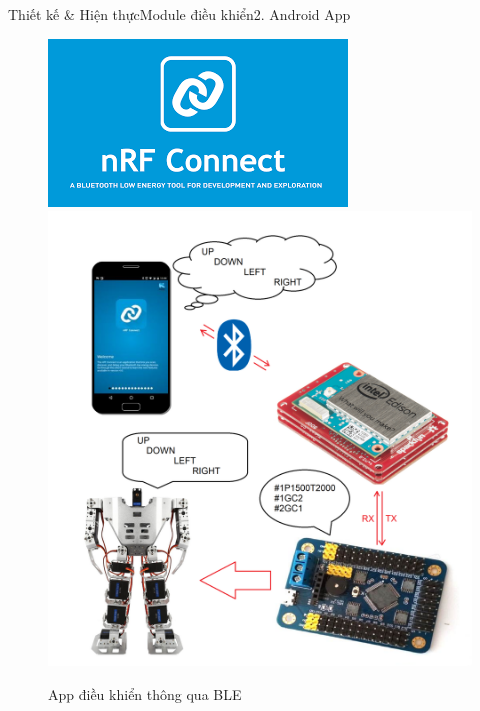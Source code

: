 \documentclass[compress, blue, 13pt,hyperref={pdfpagemode=FullScreen}]{beamer}
\begin{document}
\begin{frame}{Thiết kế \& Hiện thực}{Module điều khiển}{2. Android App}
\begin{figure}[hbtp]
\centering
\includegraphics[scale=0.4]{images/nRF.png} 
\includegraphics[scale=0.07]{images/BLEApp.png} 
\caption{App điều khiển thông qua BLE}
\end{figure}
\end{frame}
\end{document}
